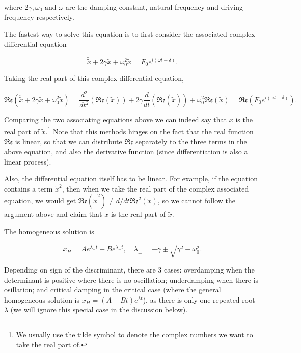 \documentclass[english,a4paper,12pt]{report}
\begin{document}
where \(2\gamma , \omega _{0} \text { and } \omega  \) are the damping constant, natural frequency and driving frequency respectively.  

The fastest way to solve this equation is to first consider the associated complex differential equation 

\begin{equation}
      \ddot{\tilde{x} } + 2 \gamma \dot{\tilde{x} } + \omega _{0}^2 \tilde{x} = F_0 e^{i(\omega t+\delta )}.  
\end{equation}

Taking the real part of this complex differential equation, 

\begin{equation}
    \mathfrak{Re} \left(  \ddot{\tilde{x} } + 2 \gamma \tilde{x}  + \omega _{0}^2 \tilde{x}\right) = \frac{d^2}{dt^2} \left(\mathfrak{Re} (\tilde{x} ) \right) + 2\gamma \frac{d}{dt} \left( \mathfrak{Re} (\dot{\tilde{x} } )  \right) + \omega _{0}^2\mathfrak{Re} (\tilde{x} ) = \mathfrak{Re} \left(   F_0 e^{i(\omega t+\delta )}  \right).
\end{equation}

Comparing the two associating equations above we can indeed say that \(x\) is the real part of \(\tilde{x} \).\footnote{We usually use the tilde symbol to denote the complex numbers we want to take the real part of.} Note that this methods hinges on the fact that the real function \(\mathfrak{Re} \) is linear, so that we can distribute \(\mathfrak{Re} \) separately to the three terms in the above equation, and also the derivative function (since differentiation is also a linear process).

Also, the differential equation itself has to be linear. For example, if the equation contains a term \(\dot{x}^2 \), then when we take the real part of the complex associated equation, we would get \( \mathfrak{Re} (\dot{\tilde{x} }^2) \neq d /dt \mathfrak{Re}^2\left( \tilde{x }  \right)    \), so we cannot follow the argument above and claim that \(x\) is the real part of \(\tilde{x} \). 

The homogeneous solution is 

\begin{equation}
    x_{H} = Ae^{\lambda _{+} t} + Be^{\lambda _{-}t }, \quad \lambda _{\pm } = -\gamma  \pm \sqrt{\gamma ^2 - \omega _{0}^2 }.        
\end{equation}

Depending on sign of the discriminant, there are 3 cases: overdamping when the determinant is positive where there is no oscillation; underdamping when there is osillation; and critical damping in the critical case (where the general homogeneous solution is \(x_{H} = (A+Bt)e^{\lambda t}\)), as there is only one repeated root \(\lambda \) (we will ignore this special case in the discussion below). 
\end{document}
